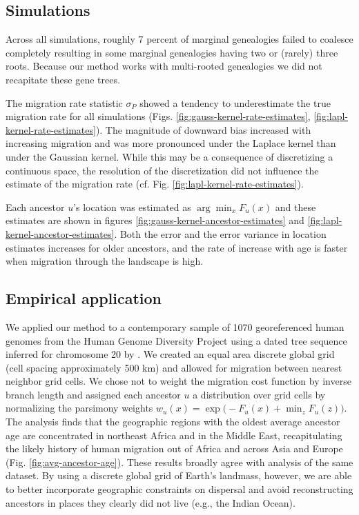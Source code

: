 \subsection{Simulations}

Across all simulations, roughly 7 percent of marginal genealogies failed to
coalesce completely resulting in some marginal genealogies having two or (rarely)
three roots. Because our method works with multi-rooted genealogies we did
not recapitate these gene trees.

The migration rate statistic $\sigma_P$ showed a tendency to underestimate the
true migration rate for all simulations (Figs. \ref{fig:gauss-kernel-rate-estimates}, 
\ref{fig:lapl-kernel-rate-estimates}). The magnitude of downward bias 
increased with increasing migration and was more pronounced under the Laplace 
kernel than under the Gaussian kernel. While this may be a consequence of
discretizing a continuous space, the resolution of the discretization did not
influence the estimate of the migration rate (cf. Fig. \ref{fig:lapl-kernel-rate-estimates}).

Each ancestor $u$'s location was estimated as $\arg\min_x F_u(x)$ and these
estimates are shown in figures \ref{fig:gauss-kernel-ancestor-estimates} and 
\ref{fig:lapl-kernel-ancestor-estimates}. Both the error and the error variance
in location estimates increases for older ancestors, and the rate of increase
with age is faster when migration through the landscape is high. 

\subsection{Empirical application}

We applied our method to a contemporary sample of 1070 georeferenced human
genomes from the Human Genome Diversity Project using a dated tree sequence
inferred for chromosome 20 by \citet{Wohns_etal_2022}. We created an equal 
area discrete global grid \citep{Barnes_Sahr_2023} (cell spacing approximately 
500 km) and allowed for migration between nearest neighbor grid cells. We
chose not to weight the migration cost function by inverse branch length and
assigned each ancestor $u$ a distribution over grid cells by normalizing the 
parsimony weights $w_u(x) = \exp\bigl(-F_u(x) + \min_z F_u(z)\bigr)$.
The analysis finds that the geographic regions with the oldest average ancestor
age are concentrated in northeast Africa and in the Middle East, recapitulating
the likely history of human migration out of Africa and across Asia and Europe 
(Fig. \ref{fig:avg-ancestor-age}). These results broadly agree with 
\citet{Wohns_etal_2022} analysis of the same dataset. By using a discrete global 
grid of Earth's landmass, however, we are able to better incorporate geographic
constraints on dispersal and avoid reconstructing ancestors in places they
clearly did not live (e.g., the Indian Ocean).
